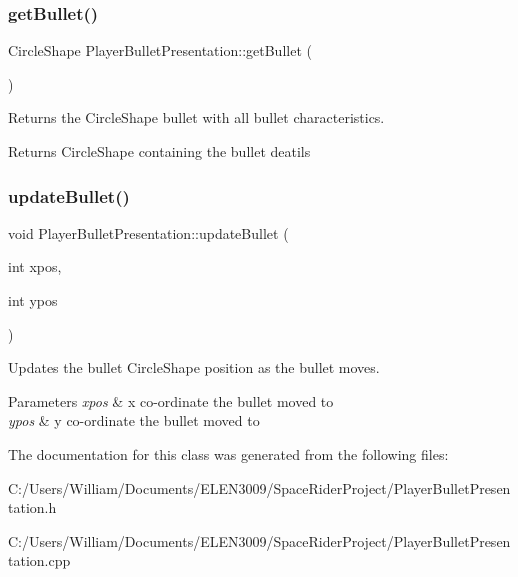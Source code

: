 \subsubsection{\texorpdfstring{get\+Bullet()}{getBullet()}}
{\footnotesize\ttfamily Circle\+Shape Player\+Bullet\+Presentation\+::get\+Bullet (\begin{DoxyParamCaption}{ }\end{DoxyParamCaption})}



Returns the Circle\+Shape bullet with all bullet characteristics. 

\begin{DoxyReturn}{Returns}
Circle\+Shape containing the bullet deatils 
\end{DoxyReturn}
\mbox{\label{class_player_bullet_presentation_ad8a28adf4326c03c52af77c7b91c5a0a}} 
\subsubsection{\texorpdfstring{update\+Bullet()}{updateBullet()}}
{\footnotesize\ttfamily void Player\+Bullet\+Presentation\+::update\+Bullet (\begin{DoxyParamCaption}\item[{int}]{xpos,  }\item[{int}]{ypos }\end{DoxyParamCaption})}



Updates the bullet Circle\+Shape position as the bullet moves. 


\begin{DoxyParams}{Parameters}
{\em xpos} & x co-\/ordinate the bullet moved to \\
\hline
{\em ypos} & y co-\/ordinate the bullet moved to \\
\hline
\end{DoxyParams}


The documentation for this class was generated from the following files\+:\begin{DoxyCompactItemize}
\item 
C\+:/\+Users/\+William/\+Documents/\+E\+L\+E\+N3009/\+Space\+Rider\+Project/Player\+Bullet\+Presentation.\+h\item 
C\+:/\+Users/\+William/\+Documents/\+E\+L\+E\+N3009/\+Space\+Rider\+Project/Player\+Bullet\+Presentation.\+cpp\end{DoxyCompactItemize}
